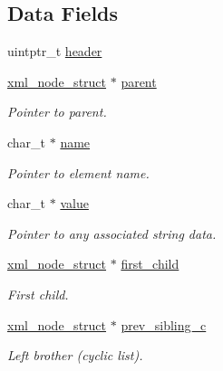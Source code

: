 \subsection*{Data Fields}
\begin{DoxyCompactItemize}
\item 
uintptr\_\-t \hyperlink{structpugi_1_1xml__node__struct_aea2e405a368dc5a278a2d23465f1975c}{header}
\item 
\hyperlink{structpugi_1_1xml__node__struct}{xml\_\-node\_\-struct} $\ast$ \hyperlink{structpugi_1_1xml__node__struct_af692c222bcc5a9f61108cb3ae0b7b5ea}{parent}
\begin{DoxyCompactList}\small\item\em Pointer to parent. \item\end{DoxyCompactList}\item 
char\_\-t $\ast$ \hyperlink{structpugi_1_1xml__node__struct_ae2324fdbd1e307fb12007d1d0f957a0b}{name}
\begin{DoxyCompactList}\small\item\em Pointer to element name. \item\end{DoxyCompactList}\item 
char\_\-t $\ast$ \hyperlink{structpugi_1_1xml__node__struct_a191e708864fccda17bb66157afdadd2d}{value}
\begin{DoxyCompactList}\small\item\em Pointer to any associated string data. \item\end{DoxyCompactList}\item 
\hyperlink{structpugi_1_1xml__node__struct}{xml\_\-node\_\-struct} $\ast$ \hyperlink{structpugi_1_1xml__node__struct_af72c49a0f81928ef664d9d2f0260f23d}{first\_\-child}
\begin{DoxyCompactList}\small\item\em First child. \item\end{DoxyCompactList}\item 
\hyperlink{structpugi_1_1xml__node__struct}{xml\_\-node\_\-struct} $\ast$ \hyperlink{structpugi_1_1xml__node__struct_a74e62128c88c422c0ed969633bbb2d4e}{prev\_\-sibling\_\-c}
\begin{DoxyCompactList}\small\item\em Left brother (cyclic list). \item\end{DoxyCompactList}\item 

\end{DoxyCompactItemize}
